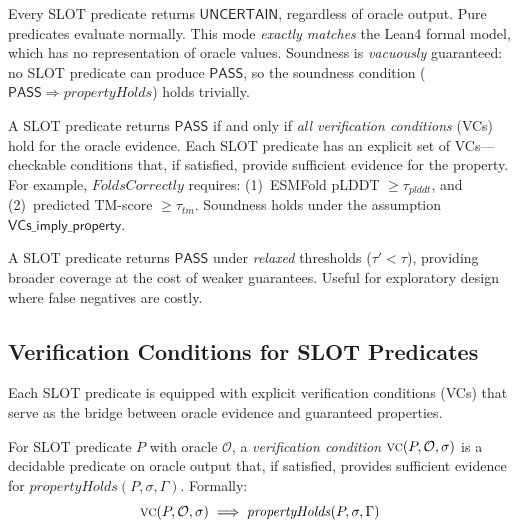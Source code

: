 \documentclass[acmsmall,review,anonymous]{acmart}
\newcommand{\PASS}{\ensuremath{\mathsf{PASS}}\xspace}
\newcommand{\UNCERTAIN}{\ensuremath{\mathsf{UNCERTAIN}}\xspace}
\newcommand{\seq}{\sigma}
\newcommand{\pred}{P}
\newcommand{\VC}{\textsc{vc}\xspace}
\newcommand{\CONSERVATIVE}{\textsc{Conservative}\xspace}
\newcommand{\VERIFIED}{\textsc{Verified}\xspace}
\newcommand{\PERMISSIVE}{\textsc{Permissive}\xspace}
\begin{document}
\begin{description}[leftmargin=!,labelwidth=2.2cm,itemsep=3pt,topsep=2pt]
\item[\CONSERVATIVE:]
Every SLOT predicate returns \UNCERTAIN, regardless of oracle output.
Pure predicates evaluate normally.
This mode \emph{exactly matches} the Lean4 formal model, which has no
representation of oracle values.
Soundness is \emph{vacuously} guaranteed: no SLOT predicate can produce
\PASS, so the soundness condition
($\PASS \Rightarrow \mathit{propertyHolds}$) holds trivially.

\item[\VERIFIED:]
A SLOT predicate returns \PASS{} if and only if \emph{all verification
conditions} (VCs) hold for the oracle evidence.
Each SLOT predicate has an explicit set of VCs---checkable conditions
that, if satisfied, provide sufficient evidence for the property.
For example, $\mathit{FoldsCorrectly}$ requires:
(1)~ESMFold pLDDT $\ge \tau_{\mathit{plddt}}$, and
(2)~predicted TM-score $\ge \tau_{\mathit{tm}}$.
Soundness holds under the assumption
$\textsf{VCs\_imply\_property}$.

\item[\PERMISSIVE:]
A SLOT predicate returns \PASS{} under \emph{relaxed} thresholds
($\tau' < \tau$), providing broader coverage at the cost of weaker
guarantees.
Useful for exploratory design where false negatives are costly.
\end{description}

\subsection{Verification Conditions for SLOT Predicates}\label{sec:vcs}

Each SLOT predicate is equipped with explicit verification conditions
(VCs) that serve as the bridge between oracle evidence and guaranteed
properties.

\begin{definition}
For SLOT predicate $\pred$ with oracle $\mathcal{O}$, a
\emph{verification condition} $\VC(\pred, \mathcal{O}, \seq)$ is a
decidable predicate on oracle output that, if satisfied, provides
sufficient evidence for $\mathit{propertyHolds}(\pred, \seq, \Gamma)$.
Formally:
\[
  \VC(\pred, \mathcal{O}, \seq) \;\Longrightarrow\;
  \mathit{propertyHolds}(\pred, \seq, \Gamma)
\]
\end{definition}
\end{document}

